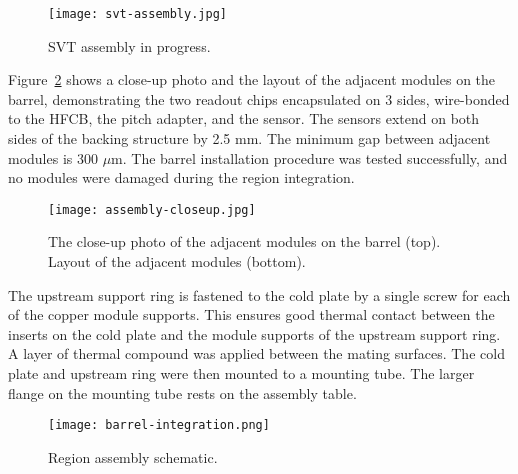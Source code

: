 \begin{figure}[hbt] 
\centering 
\texttt{[image: svt-assembly.jpg]}
\caption{SVT assembly in progress.}
\label{fig:svt-assembly}
\end{figure}

Figure~\ref{fig:assembly-closeup} shows a close-up photo and the layout of the adjacent modules on the barrel, demonstrating the two readout chips encapsulated on 3 sides, wire-bonded to the HFCB, the pitch adapter, and the sensor. The sensors extend on both sides of the backing structure by 2.5 mm. The minimum gap between adjacent modules is 300 $\mu$m. The barrel installation procedure was tested successfully, and no modules were damaged during the region integration.

\begin{figure}[hbt] 
\centering 
\texttt{[image: assembly-closeup.jpg]}
\caption{The close-up photo of the adjacent modules on the barrel (top). Layout of the adjacent modules (bottom).}
\label{fig:assembly-closeup}
\end{figure}

The upstream support ring is fastened to the cold plate by a single screw for each of the copper module supports. This ensures good thermal contact between the inserts on the cold plate and the module supports of the upstream support ring. A layer of thermal compound was applied between the mating surfaces. The cold plate and upstream ring were then mounted to a mounting tube. The larger flange on the mounting tube rests on the assembly table. 

\begin{figure}[hbt] 
\centering 
\texttt{[image: barrel-integration.png]}
\caption{Region assembly schematic.}
\label{fig:barrel-integration}
\end{figure}

